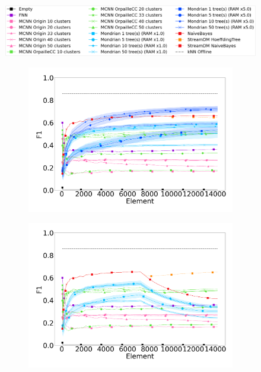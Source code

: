 \begin{figure}
	\centering
	\includegraphics[width=\linewidth]{figures/legend.png}
	\begin{subfigure}[t]{.49\linewidth}
		\includegraphics[width=\linewidth]{figures/results/banos_6_f1_std.png}
		\caption{\banosdataset}
		\label{fig:f1-banos}
	\end{subfigure}
	\begin{subfigure}[t]{.49\linewidth}
		\includegraphics[width=\linewidth]{figures/results/drift_6_f1_std.png}

\end{subfigure}
\end{figure}
